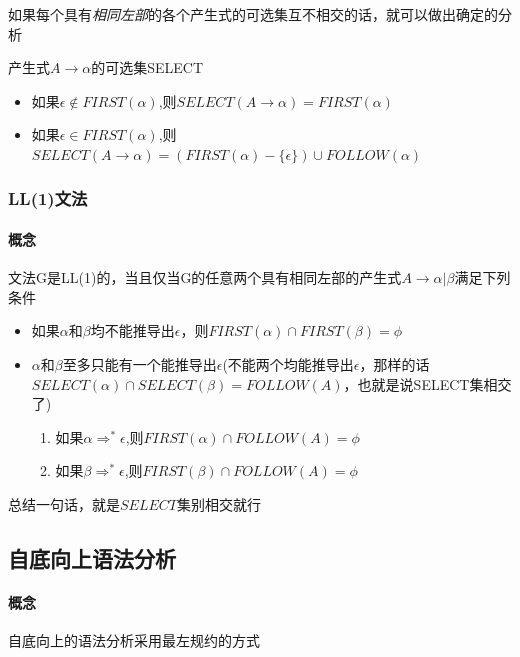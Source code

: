 \documentclass[UTF8]{ctexart} %
\begin{document}
如果每个具有\emph{相同左部}的各个产生式的可选集互不相交的话，就可以做出确定的分析

产生式$A\rightarrow \alpha$的可选集SELECT

\begin{itemize}
    \item 如果$\epsilon \notin FIRST(\alpha)$,则$SELECT(A\rightarrow\alpha)=FIRST(\alpha)$
    \item 如果$\epsilon \in FIRST(\alpha)$,则$SELECT(A\rightarrow\alpha)=(FIRST(\alpha)-\{\epsilon\})\cup FOLLOW(\alpha)$
\end{itemize}

\subsubsection{LL(1)文法}

\paragraph{概念} 文法G是LL(1)的，当且仅当G的任意两个具有相同左部的产生式$A\rightarrow \alpha|\beta$满足下列条件

\begin{itemize}
    \item 如果$\alpha$和$\beta$均不能推导出$\epsilon$，则$FIRST(\alpha)\cap FIRST(\beta)=\phi $
    \item $\alpha$和$\beta$至多只能有一个能推导出$\epsilon$(不能两个均能推导出$\epsilon$，那样的话$SELECT(\alpha)\cap SELECT(\beta)=FOLLOW(A)$，也就是说SELECT集相交了)
          \begin{enumerate}
              \item 如果$\alpha\Rightarrow^* \epsilon$,则$FIRST(\alpha)\cap FOLLOW(A)=\phi$
              \item 如果$\beta\Rightarrow^* \epsilon$,则$FIRST(\beta)\cap FOLLOW(A)=\phi$
          \end{enumerate}
\end{itemize}

总结一句话，就是$SELECT$集别相交就行

\subsection{自底向上语法分析}

\paragraph{概念} 自底向上的语法分析采用最左规约的方式
\end{document}
